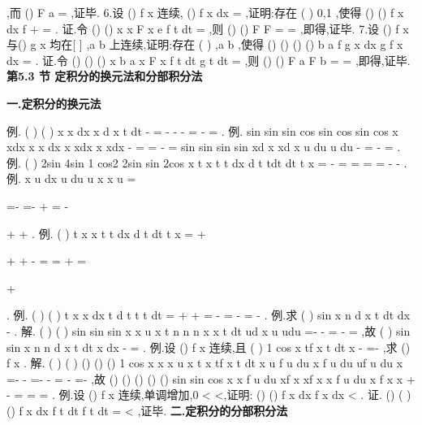 \int 
,而
()
F a =
,证毕. 
6.设
()
f x 连续,
()
f x dx =
\int 
,证明:存在
(
)
0,1
\psi \in 
,使得
()
()
f x dx
f
\psi 
\lambda 
\psi 
+
=
\int 
. 
证.令
()
()
x
x
F x
e
f t dt
\lambda 
=
\int 
,则
()
()
F
F
=
=
,即得,证毕. 
7.设
()
f x 与()
g x 均在[
]
,a b 上连续,证明:存在
(
)
,a b
\psi \in 
,使得 
()
()
()
()
b
a
f
g x dx
g
f x dx
\psi 
\psi 
\psi 
\psi 
=
\int 
\int 
. 
证.令
()
()
()
x
b
a
x
F x
f t dt
g t dt
=
\cdots 
\int 
\int 
,则
()
()
F a
F b
=
=
,即得,证毕. 
\vspace{6pt}
{\large \bfseries \textcolor{lyred}{第5.3 节 定积分的换元法和分部积分法}}

\vspace{4pt}
{\bfseries \textcolor{lyred}{一.定积分的换元法}}

\textcolor{lyred}{例}.
(
)
(
)
x
x dx
x
d x
t dt
\pi 
-
=
-
-
-
=
-
=
\int 
\int 
\int 
. 
\textcolor{lyred}{例}.
sin
sin
sin
cos
sin
cos
sin
cos
x
xdx
x
x dx
x
xdx
x
xdx
\pi 
\pi 
\pi 
\pi 
\pi 
-
=
=
-
=
\int 
\int 
\int 
\int 
sin
sin
sin
sin
xd
x
xd
x
u du
u du
\pi 
\pi 
\pi 
-
=
-
=
\int 
\int 
\int 
\int 
. 
\textcolor{lyred}{例}.
(
)
2sin
4sin
1 cos2
2sin
sin
2cos
x
t
x
t
t
dx
d
t
tdt
dt
t
x
\pi 
\pi 
\pi 
\pi 
=
-
=
=
=
=
-
-
\int 
\int 
\int 
\int 
. 
\textcolor{lyred}{例}.
x u
dx
u
du
u
x
x
u
=


=-
=-
+
=
-


+
+
\int 
\int 
. 
\textcolor{lyred}{例}.
(
)
t
x
x
t
t
dx
d
t
dt
t
x
=
+


+
+
-
=
=
+
=


+


\int 
\int 
\int 
. 
\textcolor{lyred}{例}.
(
)
(
)
t
x
x
dx
t d t
t
t
dt
=
+
+
=
\cdots 
-
=
-
=
-
\int 
\int 
\int 
. 
\textcolor{lyred}{例}.求
(
)
sin
x
n
d
x
t dt
dx
-
\int 
. 
解.
(
)
(
)
sin
sin
sin
x
x
u x t
n
n
n
x
x t dt
ud x u
udu
=-
-
=
-
=
\int 
\int 
\int 
,故
(
)
sin
sin
x
n
n
d
x
t dt
x
dx
-
=
\int 
. 
\textcolor{lyred}{例}.设
()
f x 连续,且
(
)
1 cos
x
tf x
t dt
x
-
=-
\int 
,求
()
f x . 
解.
(
)
(
)
()
()
()
1 cos
x
x
x
u x t
x
tf x
t dt
x
u f u du
x
f u du
uf u du
x
=-
-
=-
-
=
-
=-
\int 
\int 
\int 
\int 
,故 
()
()
()
()
()
sin
sin
cos
x
x
f u du
xf x
xf x
x
f u du
x
f x
x
+
-
=
\Rightarrow 
=
\Rightarrow 
=
\int 
\int 
. 
\textcolor{lyred}{例}.设
()
f x 连续,单调增加,0
\lambda 
<
<,证明:
()
()
f x dx
f x dx
\lambda 
\lambda 
<
\int 
\int 
. 
\textcolor{lyred}{证}.
()
(
)
()
f x dx
f
t dt
f t dt
\lambda 
\lambda 
\lambda 
\lambda 
=
<
\int 
\int 
\int 
,证毕. 
\vspace{4pt}
{\bfseries \textcolor{lyred}{二.定积分的分部积分法}}

